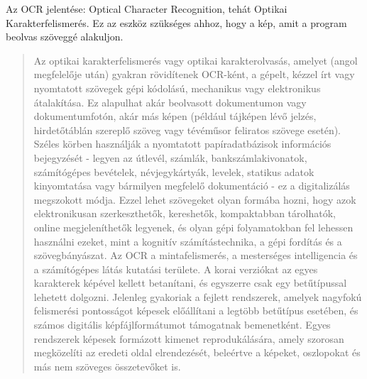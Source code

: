 
Az OCR jelentése: Optical Character Recognition, tehát Optikai Karakterfelismerés. Ez az eszköz szükséges ahhoz, hogy a kép, amit a program beolvas szöveggé alakuljon.

\begin{quotation}
	Az optikai karakterfelismerés vagy optikai karakterolvasás, amelyet (angol megfelelője után) gyakran rövidítenek OCR-ként, a gépelt, kézzel írt vagy nyomtatott szövegek gépi kódolású, mechanikus vagy elektronikus átalakítása. Ez alapulhat akár beolvasott dokumentumon vagy dokumentumfotón, akár más képen (például tájképen lévő jelzés, hirdetőtáblán szereplő szöveg vagy tévéműsor feliratos szövege esetén). Széles körben használják a nyomtatott papíradatbázisok információs bejegyzését - legyen az útlevél, számlák, bankszámlakivonatok, számítógépes bevételek, névjegykártyák, levelek, statikus adatok kinyomtatása vagy bármilyen megfelelő dokumentáció - ez a digitalizálás megszokott módja. Ezzel lehet szövegeket olyan formába hozni, hogy azok elektronikusan szerkeszthetők, kereshetők, kompaktabban tárolhatók, online megjeleníthetők legyenek, és olyan gépi folyamatokban fel lehessen használni ezeket, mint a kognitív számítástechnika, a gépi fordítás és a szövegbányászat. Az OCR a mintafelismerés, a mesterséges intelligencia és a számítógépes látás kutatási területe. A korai verziókat az egyes karakterek képével kellett betanítani, és egyszerre csak egy betűtípussal lehetett dolgozni. Jelenleg gyakoriak a fejlett rendszerek, amelyek nagyfokú felismerési pontosságot képesek előállítani a legtöbb betűtípus esetében, és számos digitális képfájlformátumot támogatnak bemenetként. Egyes rendszerek képesek formázott kimenet reprodukálására, amely szorosan megközelíti az eredeti oldal elrendezését, beleértve a képeket, oszlopokat és más nem szöveges összetevőket is.
\end{quotation}

